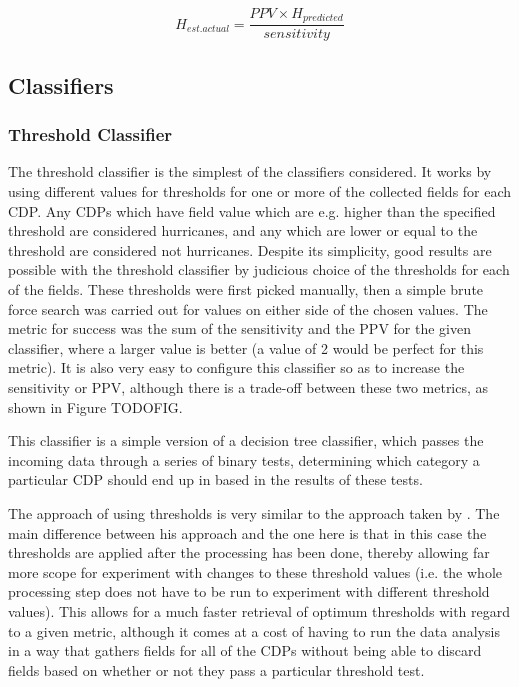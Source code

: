 \documentclass[pdftex,12pt,a4paper]{report}
\begin{document}
\begin{equation}
    H_{est. actual} = \frac{PPV \times H_{predicted}}{sensitivity}
    \label{eqn:n_actual_hurricane}
\end{equation}

\subsection{Classifiers}

\subsubsection{Threshold Classifier}
The threshold classifier is the simplest of the classifiers considered. It works by using different
values for thresholds for one or more of the collected fields for each CDP. Any CDPs which have
field value which are e.g. higher than the specified threshold are considered hurricanes, and any
which are lower or equal to the threshold are considered not hurricanes. Despite its simplicity,
good results are possible with the threshold classifier by judicious choice of the thresholds for
each of the fields. These thresholds were first picked manually, then a simple brute force search
was carried out for values on either side of the chosen values. The metric for success was the sum
of the sensitivity and the PPV for the given classifier, where a larger value is better (a value of
2 would be perfect for this metric). It is also very easy to configure this classifier so as to
increase the sensitivity or PPV, although there is a trade-off between these two metrics, as shown
in Figure TODOFIG.

This classifier is a simple version of a decision tree classifier, which passes the incoming data
through a series of binary tests, determining which category a particular CDP should end up in based
in the results of these tests.

The approach of using thresholds is very similar to the approach taken by
\textcite{walshObjective1997}. The main difference between his approach and the one here is that in
this case the thresholds are applied after the processing has been done, thereby allowing far more
scope for experiment with changes to these threshold values (i.e. the whole processing step does not
have to be run to experiment with different threshold values). This allows for a much faster
retrieval of optimum thresholds with regard to a given metric, although it comes at a cost of having
to run the data analysis in a way that gathers fields for all of the CDPs without being able to
discard fields based on whether or not they pass a particular threshold test.
\end{document}
